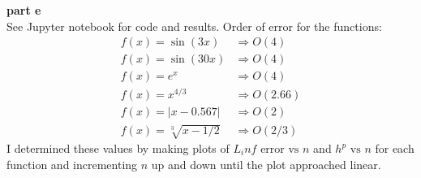 \documentclass{article} %
\begin{document}
\textbf{part e} \\
See Jupyter notebook for code and results.
Order of error for the functions:
\begin{align*}
f(x)=\sin(3x) &\Rightarrow O(4) \\
f(x)=\sin(30x) &\Rightarrow O(4) \\
f(x)=e^x &\Rightarrow O(4) \\
f(x)=x^{4/3} &\Rightarrow O(2.66) \\
f(x)=|x-0.567| &\Rightarrow O(2) \\
f(x)= \sqrt[3]{x-1/2} &\Rightarrow O(2/3)
\end{align*}
I determined these values by making plots of $L_inf \text{ error vs } n$ and $h^p \text{ vs }n$ for each function and incrementing $n$ up and down until the plot approached linear.
\\
\end{document}

